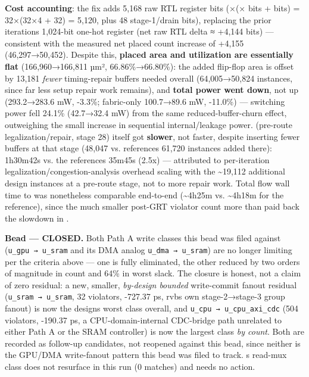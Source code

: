 \begin{record}
\textbf{Cost accounting}: the fix adds 5,168 raw RTL register bits
(×(×  bits +
  bits) = 32×(32×4 + 32) = 5,120, plus 48
stage-1/\allowbreak{}drain bits), replacing the prior
iteration\textquotesingle s 1,024-bit  one-hot register
(net raw RTL delta ≈ +4,144 bits) --- consistent with the measured net
placed  count increase of +4,155 (46,297→50,452).
Despite this, \textbf{placed area and utilization are essentially flat}
(166,960→166,811 µm², 66.86\%→66.80\%): the added flip-flop area is
offset by 13,181 \emph{fewer} timing-repair buffers needed overall
(64,005→50,824  instances, since far less
setup repair work remains), and \textbf{total power went down}, not up
(293.2→283.6 mW, -3.3\%; fabric-only 100.7→89.6 mW, -11.0\%) ---
switching power fell 24.1\% (42.7→32.4 mW) from the same
reduced-buffer-churn effect, outweighing the small increase in
sequential internal/\allowbreak{}leakage power.
 (pre-route legalization/\allowbreak{}repair,
stage 28) itself got \textbf{slower}, not faster, despite inserting
fewer buffers at that stage (48,047 vs. reference\textquotesingle s
61,720  instances added there): 1h30m42s vs.
the reference\textquotesingle s 35m45s (2.5x) --- attributed to
per-iteration legalization/\allowbreak{}congestion-analysis overhead
scaling with the \textasciitilde19,112 additional design instances at a
pre-route stage, not to more repair work. Total flow wall time to
 was nonetheless comparable end-to-end
(\textasciitilde4h25m vs. \textasciitilde4h18m for the reference), since
the much smaller post-GRT violator count more than paid back the
 slowdown in .

\textbf{Bead  --- CLOSED.} Both Path A write classes this bead
was filed against (\texttt{u\_\allowbreak{}gpu\ →\ u\_\allowbreak{}sram}
and its DMA analog
\texttt{u\_\allowbreak{}dma\ →\ u\_\allowbreak{}sram}) are no longer
limiting per the criteria above --- one is fully eliminated, the other
reduced by two orders of magnitude in count and 64\% in worst slack. The
closure is honest, not a claim of zero residual: a new, smaller,
\emph{by-design bounded} write-commit fanout residual
(\texttt{u\_\allowbreak{}sram\ →\ u\_\allowbreak{}sram}, 32 violators,
-727.37 ps, rvb\textquotesingle s own stage-2→stage-3 group fanout) is
now the design\textquotesingle s worst class overall, and
\texttt{u\_\allowbreak{}cpu\ →\ u\_\allowbreak{}cpu\_\allowbreak{}axi\_\allowbreak{}cdc}
(504 violators, -190.37 ps, a CPU-domain-internal CDC-bridge path
unrelated to either Path A or the SRAM controller) is now the largest
class \emph{by count}. Both are recorded as follow-up candidates, not
reopened against this bead, since neither is the GPU/DMA write-fanout
pattern this bead was filed to track. \textquotesingle s
read-mux class does not resurface in this run (0 matches) and needs no
action.


\end{record}
